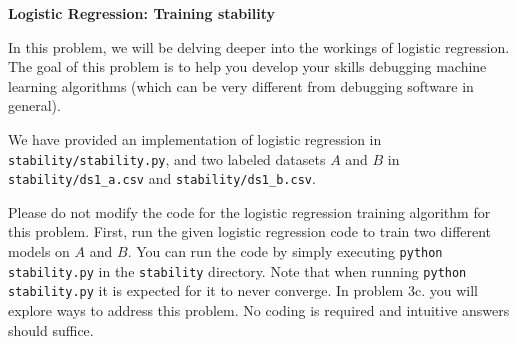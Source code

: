 \item {\bf Logistic Regression: Training stability}

In this problem, we will be delving deeper into the workings of logistic
regression. The goal of this problem is to help you develop your skills
debugging machine learning algorithms (which can be very different from
debugging software in general).

We have provided an implementation of logistic regression in
\texttt{stability/stability.py}, and two labeled datasets $A$ and $B$ in
\texttt{stability/ds1\_a.csv} and \texttt{stability/ds1\_b.csv}.

Please do not modify the code for the logistic regression training algorithm
for this problem. First, run the given logistic regression code to train two
different models on $A$ and $B$. You can run the code by simply executing
\texttt{python stability.py} in the \texttt{stability} directory. Note that
when running \texttt{python stability.py} it is expected for it to never converge. In problem
3c. you will explore ways to address this problem. No coding is required and intuitive
answers should suffice.

\begin{enumerate}

  

  

  

\end{enumerate}
